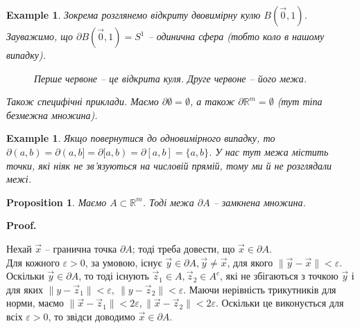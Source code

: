\documentclass[a4paper, 10pt]{article}
\makeatletter
\def\qed{$\blacksquare$}
\theoremstyle{theoremdd}
\theoremstyle{theoremdd}
\theoremstyle{theoremdd}
\theoremstyle{theoremdd}
\theoremstyle{theoremdd}
\newtheorem{example}[theorem]{Example}
\theoremstyle{theoremdd}
\newtheorem{proposition}[theorem]{Proposition}
\theoremstyle{theoremdd}
\theoremstyle{theoremdd}
\theoremstyle{theoremdd}
\renewenvironment{proof}[1][Proof.\\]{\par
\pushQED{\hfill \qed}%
\normalfont \topsep6\p@\@plus6\p@\relax
\trivlist
\item\relax
{\bfseries
#1\@addpunct{.}}\hspace\labelsep\ignorespaces
}{%
\popQED\endtrivlist\@endpefalse
}
\makeatother
\begin{document}
\begin{example}
Зокрема розглянемо відкриту двовимірну кулю $B(\vec{0},1)$. Зауважимо, що $\partial B(\vec{0},1) = S^1$ -- одинична сфера (тобто коло в нашому випадку).
\begin{figure}[H]
\centering
{}
\qquad
{}
\caption*{Перше червоне -- це відкрита куля. Друге червоне -- його межа.}
\end{figure}
Також специфічні приклади. Маємо $\partial \emptyset = \emptyset$, а також $\partial \mathbb{R}^m = \emptyset$ (тут тіпа безмежна множина).
\end{example}

\begin{example}
Якщо повернутися до одновимірного випадку, то $\partial (a,b) = \partial (a,b] = \partial [a,b) = \partial [a,b] = \{a,b\}$. У нас тут межа містить точки, які ніяк не зв'язуються на числовій прямій, тому ми й не розглядали межі.
\end{example}

\begin{proposition}
Маємо $A \subset \mathbb{R}^m$. Тоді межа $\partial A$ -- замкнена множина.
\end{proposition}

\begin{proof}
Нехай $\vec{x}$ -- гранична точка $\partial A$; тоді треба довести, що $\vec{x} \in \partial A$.\\
Для кожного $\varepsilon > 0$, за умовою, існує $\vec{y} \in \partial A, \vec{y} \neq \vec{x}$, для якого $\|\vec{y} - \vec{x}\| < \varepsilon$. Оскільки $\vec{y} \in \partial A$, то тоді існують $\vec{z}_1 \in A, \vec{z}_2 \in A^c$, які не збігаються з точкою $\vec{y}$ і для яких $\|y - \vec{z}_1\| < \varepsilon,\ \|y - \vec{z}_2\| < \varepsilon$. Маючи нерівність трикутників для норми, маємо $\|\vec{x} - \vec{z}_1\| < 2\varepsilon, \|\vec{x} - \vec{z}_2\| < 2\varepsilon$. Оскільки це виконується для всіх $\varepsilon > 0$, то звідси доводимо $\vec{x} \in \partial A$.
\end{proof}
\end{document}
